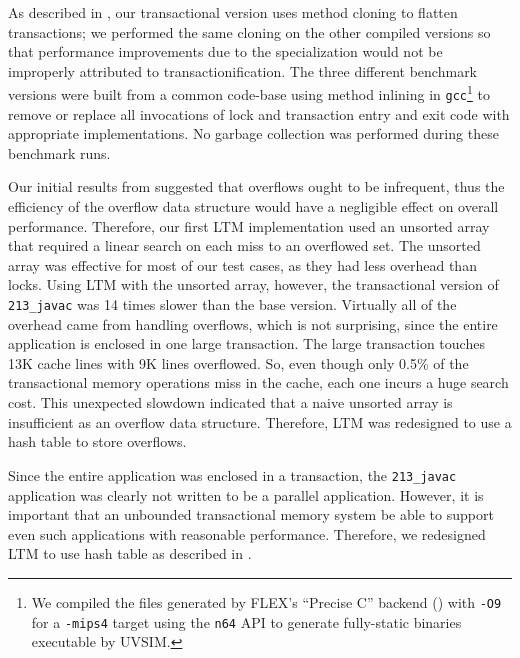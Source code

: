As described in , our transactional version uses method
cloning to flatten transactions; we performed the same cloning on the
other compiled versions so that performance improvements due to the
specialization would not be improperly attributed to
transactionification.  The three different benchmark versions were
built from a common code-base using method inlining in \texttt{gcc}\footnote{We
compiled the files generated by FLEX's ``Precise C'' backend
() with
\texttt{-O9} for a \texttt{-mips4} target using the
\texttt{n64} API to generate fully-static binaries executable by
UVSIM.}  to remove or replace all invocations of lock and transaction
entry and exit code with appropriate implementations.  No garbage
collection was performed during these benchmark runs.

\label{sec:javac}
Our initial results from  suggested that
overflows ought to be infrequent, thus the efficiency of the overflow
data structure would 
have a negligible effect on overall performance. Therefore, our first
LTM implementation used an unsorted array that required a linear
search on each miss to an overflowed set. The unsorted array was
effective for most of our test cases, as they had less overhead than
locks.  Using LTM with the unsorted array, however, the transactional
version of \texttt{213\_javac} was 14 times slower than the base
version.  Virtually all of the overhead came from handling overflows,
which is not surprising, since the entire application is enclosed in
one large transaction. The large transaction touches 13K cache lines
with 9K lines overflowed.  So, even though only 0.5\% of the
transactional memory operations miss in the cache, each one incurs a
huge search cost. This unexpected slowdown indicated that a naive
unsorted array is insufficient as an overflow data
structure. Therefore, LTM was redesigned to use a hash table to store
overflows.

Since the entire application was enclosed in a transaction, the
\texttt{213\_javac} application was clearly not written to be a
parallel application. However, it is important that an unbounded
transactional memory system be able to support even such applications
with reasonable performance. Therefore, we redesigned LTM to use hash
table as described in .


